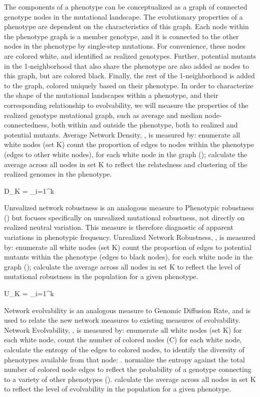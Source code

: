 The components of a phenotype can be conceptualized as a graph of connected genotype nodes in the mutational landscape. The evolutionary properties of a phenotype are dependent on the characteristics of this graph.  Each node within the phenotype graph is a member genotype, and it is connected to the other nodes in the phenotype by single-step mutations. For convenience, these nodes are colored white, and identified as realized genotypes. Further, potential mutants in the 1-neighborhood that also share the phenotype are also added as nodes to this graph, but are colored black. Finally, the rest of the 1-neighborhood is added to the graph, colored uniquely based on their phenotype. 
In order to characterize the shape of the mutational landscapes within a phenotype, and their corresponding relationship to evolvability, we will measure the properties of the realized genotype mutational graph, such as average and median node-connectedness, both within and outside the phenotype, both to realized and potential mutants. 
Average Network Density, , is measured by:
enumerate all white nodes (set K)
count the proportion of edges to nodes within the phenotype (edges to other white nodes), for each white node in the graph ();
calculate the average across all nodes in set K to reflect the relatedness and clustering of the realized genomes in the phenotype.

D_{K} =  { \sum_{i=1}^{k}} 


Unrealized network robustness is an analogous measure to Phenotypic robustness () but focuses specifically on unrealized mutational robustness, not directly on realized neutral variation. This measure is therefore diagnostic of apparent variations in phenotypic frequency. 
Unrealized Network Robustness, , is measured by:
enumerate all white nodes (set K)
count the proportion of edges to potential mutants within the phenotype (edges to black nodes), for each white node in the graph ();
calculate the average across all nodes in set K to reflect the level of mutational robustness in the population for a given phenotype.

U_{K} =  { \sum_{i=1}^{k}} 


Network evolvability is an analogous measure to Genomic Diffusion Rate, and is used to relate the new network measures to existing measures of evolvability.
Network Evolvability, , is measured by:
enumerate all white nodes (set K)
for each white node, count the number of colored nodes (C)
for each white node, calculate the entropy of the edges to colored nodes, to identify the diversity of phenotypes available from that node: .
normalize the entropy against the total number of colored node edges to reflect the probability of a genotype connecting to a variety of other phenotypes ().
calculate the average across all nodes in set K to reflect the level of evolvability in the population for a given phenotype.

